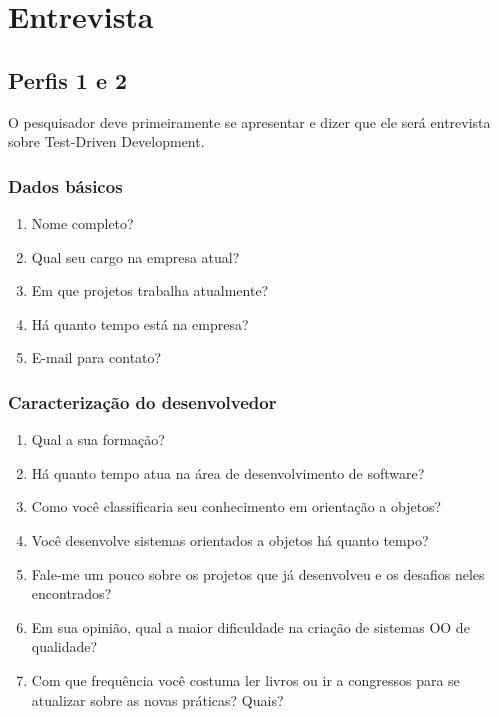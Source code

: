 \chapter{Entrevista}
\label{ape:entrevista}

\section{Perfis 1 e 2}

O pesquisador deve primeiramente se apresentar e dizer que ele será entrevista
sobre Test-Driven Development.

\subsection{Dados básicos}
\label{entrevista:dados-basicos}

\begin{enumerate}
	\item Nome completo?

	\item Qual seu cargo na empresa atual?
	
	\item Em que projetos trabalha atualmente?
	
	\item Há quanto tempo está na empresa?

	\item E-mail para contato?

\end{enumerate}

\subsection{Caracterização do desenvolvedor}
\label{entrevista:caracterizacao}

\begin{enumerate}
	\item Qual a sua formação?

	\item Há quanto tempo atua na área de desenvolvimento de software?

	\item Como você classificaria seu conhecimento em orientação a objetos?

	\item Você desenvolve sistemas orientados a objetos há quanto tempo?	

	\item Fale-me um pouco sobre os projetos que já desenvolveu e os desafios 
	neles encontrados?

	\item Em sua opinião, qual a maior dificuldade na criação de sistemas OO de
	qualidade?

	\item Com que frequência você costuma ler livros ou ir a congressos para se 
	atualizar sobre as novas práticas? Quais?

\end{enumerate}

